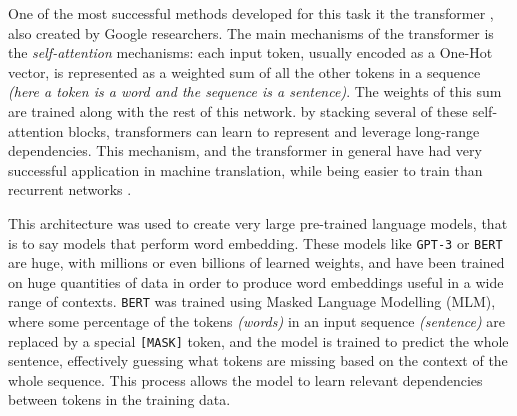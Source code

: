 \documentclass[
  11pt,
  twoside,
  BCOR=10mm,
  listof=totoc]{scrbook}
\begin{document}
One of the most successful methods developed for this task it the transformer \autocite{vaswaniAttentionAllYou2017}, also created by Google researchers. The main mechanisms of the transformer is the \emph{self-attention} mechanisms: each input token, usually encoded as a One-Hot vector, is represented as a weighted sum of all the other tokens in a sequence \emph{(here a token is a word and the sequence is a sentence)}. The weights of this sum are trained along with the rest of this network. by stacking several of these self-attention blocks, transformers can learn to represent and leverage long-range dependencies. This mechanism, and the transformer in general have had very successful application in machine translation, while being easier to train than recurrent networks \autocite{wangProgressMachineTranslation2021}.

This architecture was used to create very large pre-trained language models, that is to say models that perform word embedding. These models like \texttt{GPT-3} \autocite{brownLanguageModelsAre2020} or \texttt{BERT} \autocite{devlinBERTPretrainingDeep2019} are huge, with millions or even billions of learned weights, and have been trained on huge quantities of data in order to produce word embeddings useful in a wide range of contexts. \texttt{BERT} was trained using Masked Language Modelling (MLM), where some percentage of the tokens \emph{(words)} in an input sequence \emph{(sentence)} are replaced by a special \texttt{{[}MASK{]}} token, and the model is trained to predict the whole sentence, effectively guessing what tokens are missing based on the context of the whole sequence. This process allows the model to learn relevant dependencies between tokens in the training data.
\end{document}

